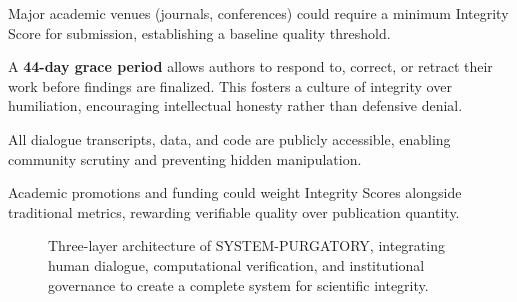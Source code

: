 \documentclass[11pt,a4paper]{article}
\begin{document}
\begin{description}[style=nextline]
    \item[\textbf{Quality Gating}] Major academic venues (journals, conferences) could require a minimum Integrity Score for submission, establishing a baseline quality threshold.
    
    \item[\textbf{Correction, Not Punishment}] A \textbf{44-day grace period} allows authors to respond to, correct, or retract their work before findings are finalized. This fosters a culture of integrity over humiliation, encouraging intellectual honesty rather than defensive denial.
    
    \item[\textbf{Radical Transparency}] All dialogue transcripts, data, and code are publicly accessible, enabling community scrutiny and preventing hidden manipulation.
    
    \item[\textbf{Incentive Realignment}] Academic promotions and funding could weight Integrity Scores alongside traditional metrics, rewarding verifiable quality over publication quantity.
\end{description}

\begin{figure}[h!]
\centering
{}
\caption{Three-layer architecture of SYSTEM-PURGATORY, integrating human dialogue, computational verification, and institutional governance to create a complete system for scientific integrity.}
\label{fig:architecture}
\end{figure}
\end{document}
